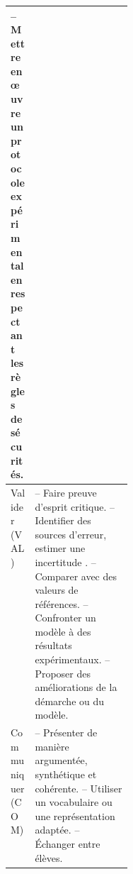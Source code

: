 \begin{tabularx}{\linewidth}{| m{0.2\linewidth} | X |}
  -- Mettre en \oe{}uvre un protocole expérimental en respectant les règles de sécurités.
  \\ \hline
  \centering Valider (VAL) & 
  -- Faire preuve d'esprit critique. \newline
  -- Identifier des sources d'erreur, estimer une incertitude .\newline
  -- Comparer avec des valeurs de références. \newline
  -- Confronter un modèle à des résultats expérimentaux. \newline
  -- Proposer des améliorations de la démarche ou du modèle.
  \\ \hline
  \centering Communiquer (COM) &
  -- Présenter de manière argumentée, synthétique et cohérente. \newline
  -- Utiliser un vocabulaire ou une représentation adaptée. \newline
  -- Échanger entre élèves.
  \\ \hline
\end{tabularx}